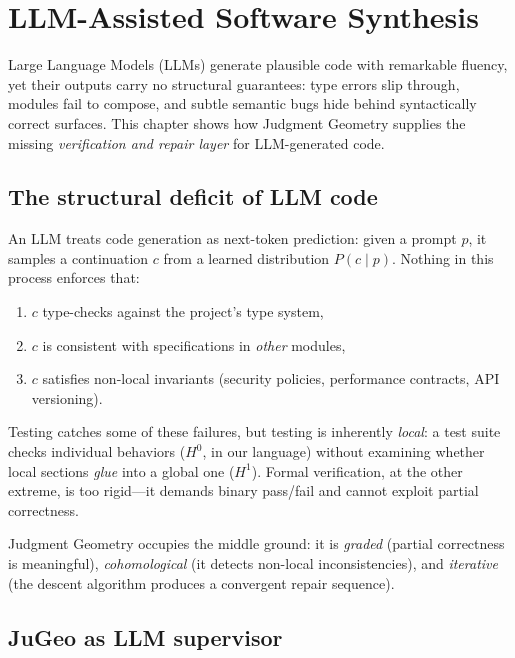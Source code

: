 
\chapter{LLM-Assisted Software Synthesis}
\label{ch:llm-synthesis}

Large Language Models (LLMs) generate plausible code with remarkable
fluency, yet their outputs carry no structural guarantees: type errors
slip through, modules fail to compose, and subtle semantic bugs hide
behind syntactically correct surfaces.  This chapter shows how
Judgment Geometry supplies the missing \emph{verification and repair
layer} for LLM-generated code.

\section{The structural deficit of LLM code}
\label{sec:llm-deficit}

An LLM treats code generation as next-token prediction: given a prompt
$p$, it samples a continuation $c$ from a learned distribution
$P(c \mid p)$.  Nothing in this process enforces that:
\begin{enumerate}[label=(\roman*)]
  \item $c$ type-checks against the project's type system,
  \item $c$ is consistent with specifications in \emph{other} modules,
  \item $c$ satisfies non-local invariants (security policies,
        performance contracts, API versioning).
\end{enumerate}
Testing catches some of these failures, but testing is inherently
\emph{local}: a test suite checks individual behaviors ($H^0$, in our
language) without examining whether local sections \emph{glue} into a
global one ($H^1$).  Formal verification, at the other extreme, is
too rigid---it demands binary pass/fail and cannot exploit partial
correctness.

Judgment Geometry occupies the middle ground: it is \emph{graded}
(partial correctness is meaningful), \emph{cohomological} (it detects
non-local inconsistencies), and \emph{iterative} (the descent algorithm
produces a convergent repair sequence).

\section{JuGeo as LLM supervisor}
\label{sec:llm-supervisor}

